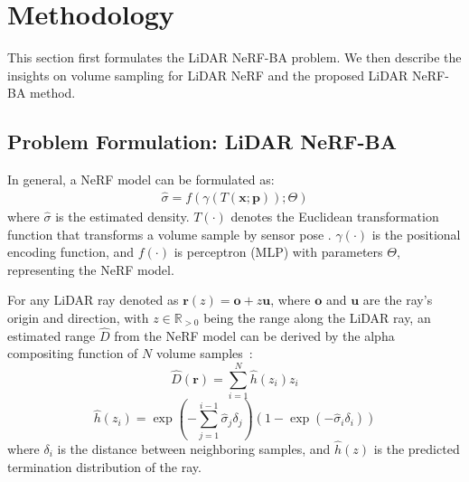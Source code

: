 \section{Methodology}\label{sec:methodology}
This section first formulates the LiDAR NeRF-BA problem. We then describe the insights on volume sampling for LiDAR NeRF and the proposed LiDAR NeRF-BA method. 

\subsection{Problem Formulation: LiDAR NeRF-BA}
In general, a NeRF model can be formulated as: 
\begin{equation}\label{eq:NeRF_model}
	\begin{split}
		\hat{\sigma} = f\left(\gamma\left(T(\mathbf{x};\mathbf{p})\right);\Theta\right)
	\end{split}
\end{equation}
where $\hat{\sigma}$ is the estimated density. $T(\cdot)$ denotes the Euclidean transformation function that transforms a volume sample  by sensor pose . $\gamma(\cdot)$ is the positional encoding function, and $f(\cdot)$ is  perceptron (MLP) with parameters $\Theta$, representing the NeRF model. 

For any LiDAR ray denoted as $\mathbf{r}(z)=\mathbf{o}+z\mathbf{u}$, where $\mathbf{o}$ and $\mathbf{u}$ are the ray's origin and direction, with $z \in \mathbb{R}_{>0}$ being the range along the LiDAR ray, an estimated range $\hat{D}$ from the NeRF model can be derived by the alpha compositing function of $N$ volume samples~\cite{mildenhall2020nerfOG}:
\begin{equation}\label{eq:alpha_compositing_part1}
	\hat{D}(\mathbf{r}) = \sum_{i=1}^{N} \hat{h}(z_i) z_i 
\end{equation}
\begin{equation}\label{eq:termination_distribution}
	\hat{h}(z_i) =
	\exp\left(- \sum_{j=1}^{i-1} \hat{\sigma}_j \delta_j \right) 
	\left(1 - \exp\left(-\hat{\sigma}_i \delta_i\right)\right) 
\end{equation}
where $\delta_i$ is the distance between neighboring samples, and $\hat{h}(z)$ is the predicted termination distribution of the ray.

